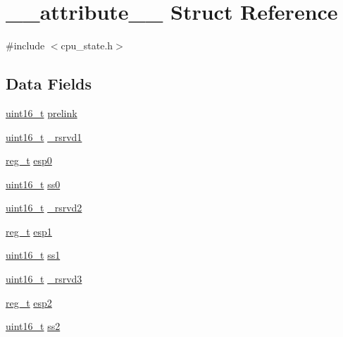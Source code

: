 \hypertarget{struct____attribute____}{\section{\-\_\-\-\_\-attribute\-\_\-\-\_\- \-Struct \-Reference}
\label{struct____attribute____}
}


{\ttfamily \#include $<$cpu\-\_\-state.\-h$>$}

\subsection*{\-Data \-Fields}
\begin{DoxyCompactItemize}
\item 
\hyperlink{types_8h_a273cf69d639a59973b6019625df33e30}{uint16\-\_\-t} \hyperlink{struct____attribute_____af60139e51063111dfe8075bc8d9b4c1a}{prelink}
\item 
\hyperlink{types_8h_a273cf69d639a59973b6019625df33e30}{uint16\-\_\-t} \hyperlink{struct____attribute_____a061cb57abbaeda5ba8498128813742a5}{\-\_\-rsrvd1}
\item 
\hyperlink{types_8h_a089269ab3c13f602c75d4c7820175d67}{reg\-\_\-t} \hyperlink{struct____attribute_____a389f5ac73704f3b0e3846233a4f47254}{esp0}
\item 
\hyperlink{types_8h_a273cf69d639a59973b6019625df33e30}{uint16\-\_\-t} \hyperlink{struct____attribute_____aaf7bbb9493112263c8abbc63e8abe07e}{ss0}
\item 
\hyperlink{types_8h_a273cf69d639a59973b6019625df33e30}{uint16\-\_\-t} \hyperlink{struct____attribute_____af2949292eb0ef0b175c0d144336bb837}{\-\_\-rsrvd2}
\item 
\hyperlink{types_8h_a089269ab3c13f602c75d4c7820175d67}{reg\-\_\-t} \hyperlink{struct____attribute_____a64c26f988bfeab4e7bca5f117eb2fa95}{esp1}
\item 
\hyperlink{types_8h_a273cf69d639a59973b6019625df33e30}{uint16\-\_\-t} \hyperlink{struct____attribute_____a2b5cbdbb50182726566b5ec9a3fd4003}{ss1}
\item 
\hyperlink{types_8h_a273cf69d639a59973b6019625df33e30}{uint16\-\_\-t} \hyperlink{struct____attribute_____a066ac320cc3f0c5d39c08a4284946e7e}{\-\_\-rsrvd3}
\item 
\hyperlink{types_8h_a089269ab3c13f602c75d4c7820175d67}{reg\-\_\-t} \hyperlink{struct____attribute_____a38cd3845ab6e82d14cbab6cf4ba16831}{esp2}
\item 
\hyperlink{types_8h_a273cf69d639a59973b6019625df33e30}{uint16\-\_\-t} \hyperlink{struct____attribute_____a2a9a52bb7b54311d2f4d885d629a6193}{ss2}

\end{DoxyCompactItemize}
